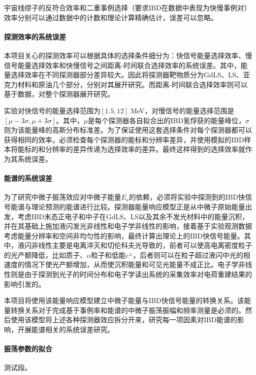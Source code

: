\documentclass[a4paper,zihao=-4]{article}
\begin{document}
宇宙线缪子的反符合效率和二重事例选择（要求IBD在数据中表现为快慢事例对）效率分别可以通过数据中的计数和理论计算精确估计，误差可以忽略。

\paragraph{探测效率的系统误差}
本项目关心的探测效率可以根据具体的选择条件细分为：快信号能量选择效率、慢信号能量选择效率和快慢信号之间距离-时间联合选择效率的系统误差。其中，能量选择效率在不同探测器部分差异较大。因此将探测器靶物质分为GdLS、LS、亚克力材料和原油几个部分，分别对其展开研究。而距离-时间联合选择效率则可以基于数据，对整个探测器展开研究。

实验对快信号的能量选择范围为$[1.5, 12]$ MeV，对慢信号的能量选择范围是$[\mu-3\sigma, \mu+3\sigma]$。其中，$\mu$是每个探测器各自拟合出的IBD氢俘获的能量峰位，$\sigma$则为该能量峰的高斯分布标准差。为了保证使用这套选择条件对每个探测器都可以获得相同的效率，必须检查每个探测器的能标和分辨率差异，并使用模拟的IBD样本将能标的和分辨率的差异传递为选择效率的差异。最终这样得到的选择效率就作为其系统误差。

\paragraph{能谱的系统误差}
为了研究中微子振荡效应对中微子能量$E_\nu$的依赖，必须将实验中探测到的IBD快信号能谱与理论预测的能谱进行比较。探测器能量响应模型正是从中微子原始能量出发，考虑IBD末态正电子和中子在GdLS、LS以及其余不发光材料中的能量沉积，并在其基础上施加液闪发光非线性和电子学非线性的影响，接着基于实验观测数据考虑能量分辨率和空间非均匀性的影响，最终计算出理论上的IBD快信号能量。其中，液闪非线性主要是电离淬灭和切伦科夫光导致的，前者可以使高电离密度粒子的光产额降低，比如质子、$\alpha$粒子和低能$e^\pm$，后者则可以在粒子超过液闪中光的相速度的情况下使光产额增加，从而使沉积能量和可见光能量不成正比。电子学非线性则是由于探测到光子的时间分布和电子学读出系统的采集效率对电荷重建结果的影响引发的。

本项目将使用该能量响应模型建立中微子能量与IBD快信号能量的转换关系。该能量转换关系对于完成基于事例率和能谱的中微子振荡振幅和频率测量是必须的。然后使用该模型将上述各种探测器效应拆分开来，研究每一项因素对IBD能谱的影响，开展能谱相关的系统误差研究。


\paragraph{振荡参数的拟合}
测试段。
\end{document}
